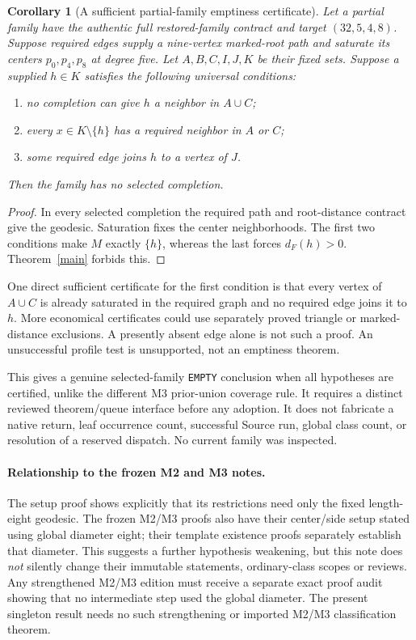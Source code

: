 \documentclass[11pt]{article}
\newtheorem{corollary}[theorem]{Corollary}
\begin{document}
\begin{corollary}[A sufficient partial-family emptiness certificate]
Let a partial family have the authentic full restored-family contract
and target $(32,5,4,8)$. Suppose required edges supply a nine-vertex
marked-root path and saturate its centers $p_0,p_4,p_8$ at degree five.
Let $A,B,C,I,J,K$ be their fixed sets. Suppose a supplied $h\in K$
satisfies the following \emph{universal} conditions:
\begin{enumerate}
\item no completion can give $h$ a neighbor in $A\cup C$;
\item every $x\in K\setminus\{h\}$ has a required neighbor in
$A$ or $C$;
\item some required edge joins $h$ to a vertex of $J$.
\end{enumerate}
Then the family has no selected completion.
\end{corollary}
\begin{proof}
In every selected completion the required path and root-distance
contract give the geodesic. Saturation fixes the center neighborhoods.
The first two conditions make $M$ exactly $\{h\}$, whereas the
last forces $d_F(h)>0$. Theorem~\ref{main} forbids this.
\end{proof}

One direct sufficient certificate for the first condition is that
every vertex of $A\cup C$ is already saturated in the required graph
and no required edge joins it to $h$. More economical certificates
could use separately proved triangle or marked-distance exclusions.
A presently absent edge alone is not such a proof. An unsuccessful
profile test is unsupported, not an emptiness theorem.

This gives a genuine selected-family \texttt{EMPTY} conclusion when
all hypotheses are certified, unlike the different M3 prior-union
coverage rule. It requires a distinct reviewed theorem/queue interface
before any adoption. It does not fabricate a native return, leaf
occurrence count, successful Source run, global class count, or
resolution of a reserved dispatch. No current family was inspected.

\paragraph{Relationship to the frozen M2 and M3 notes.}
The setup proof shows explicitly that its restrictions need only the
fixed length-eight geodesic. The frozen M2/M3 proofs also have their
center/side setup stated using global diameter eight; their template
existence proofs separately establish that diameter. This suggests a
further hypothesis weakening, but this note does \emph{not} silently
change their immutable statements, ordinary-class scopes or reviews.
Any strengthened M2/M3 edition must receive a separate exact proof
audit showing that no intermediate step used the global diameter.
The present singleton result needs no such strengthening or imported
M2/M3 classification theorem.
\end{document}
